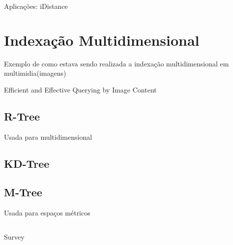Aplicações: iDistance

\cite{bptree:wiki}

\section{Indexação Multidimensional}
\label{sec:multidimsearch}

Exemplo de como estava sendo realizada a indexação multidimensional em multimidia(imagens)

Efficient and Effective Querying by Image Content

\subsection{R-Tree}

Usada para multidimensional

\subsection{KD-Tree}

\subsection{M-Tree}

Usada para espaços métricos

\subsection{}

Survey \cite{multidimensionalmethods:gaede1998}

\printbibliography